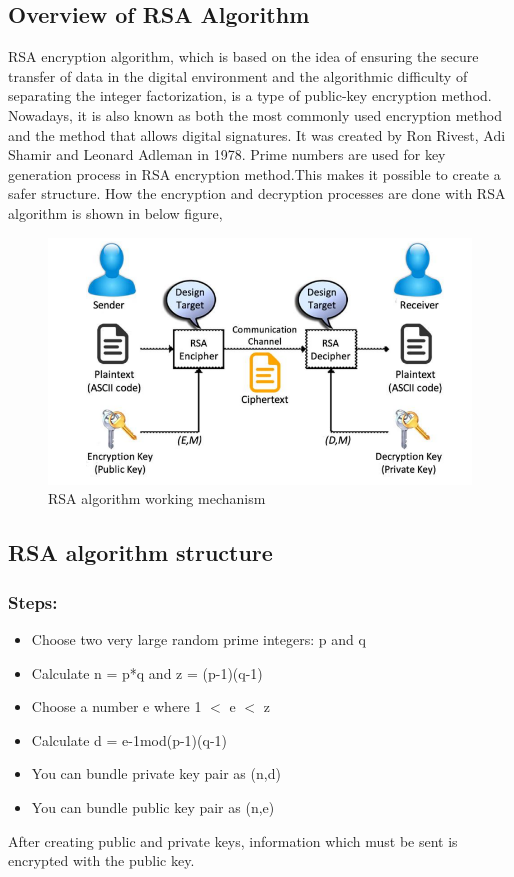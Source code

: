 \subsection{Overview of RSA Algorithm}
RSA encryption algorithm, which is based on the idea of ensuring the secure transfer of data in the digital environment and the algorithmic difficulty of separating the integer factorization, is a type of public-key encryption method. Nowadays, it is also known as both the most commonly used encryption method and the method that allows digital signatures. It was created by Ron Rivest, Adi Shamir and Leonard Adleman  in 1978. Prime numbers are used for key generation process in RSA encryption method.This makes it possible to create a safer structure. How the encryption and decryption processes
are done with RSA algorithm is shown in below figure,
\begin{figure}[H]
	\centering
	\includegraphics[width=160mm]{images/rsa algo.png}
	\caption{RSA algorithm working mechanism}
	\label{figdecisionalgo1} %
\end{figure}
\pagebreak

\subsection{RSA algorithm structure}
\subsubsection{Steps:}
\vspace{-18pt}
\begin{itemize}
	\item Choose two very large random prime integers: p and q
	\item Calculate n = p*q and z = (p-1)(q-1)
	\item Choose a number e where 1 $<$ e $<$ z
	\item Calculate d = e-1mod(p-1)(q-1)
	\item You can bundle private key pair as (n,d)
	\item You can bundle public key pair as (n,e)
\end{itemize}
After creating public and private keys, information which must be sent is encrypted with the
public key.
